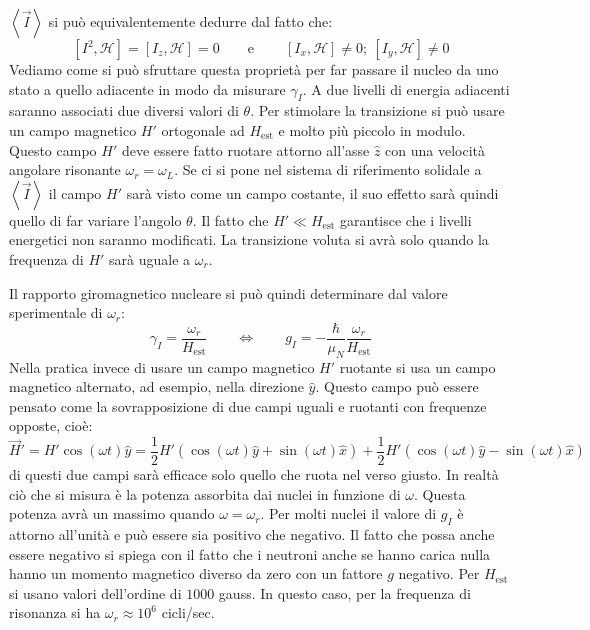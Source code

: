 $\left\langle \vec{I} \right\rangle$ si può equivalentemente dedurre dal fatto
che:
\begin{equation}
\left[ I^2, \mathcal{H} \right] = \left[ I_z, \mathcal{H} \right] = 0 \qquad 
\text{e}\ \qquad \left[ I_x, \mathcal{H} \right] \ne 0;\ \left[ I_y, 
\mathcal{H} \right] \ne 0
\end{equation}
Vediamo come si può sfruttare questa proprietà per far passare il nucleo da 
uno
stato a quello adiacente in modo da misurare $\gamma_I$. A due livelli di
energia adiacenti saranno associati due diversi valori di $\theta$. Per
stimolare la transizione si può usare un campo magnetico $H'$ ortogonale ad
$H_\text{est}$ e molto più piccolo in modulo. Questo campo $H'$ deve essere
fatto ruotare attorno all'asse $\hat{z}$ con una velocità angolare risonante
$\omega_r = \omega_L$. Se ci si pone nel sistema di riferimento solidale a
$\left\langle \vec{I} \right\rangle$ il campo $H'$ sarà visto come un campo
costante, il suo effetto sarà quindi quello di far variare l'angolo $\theta$. 
Il
fatto che $H' \ll H_\text{est}$ garantisce che i livelli energetici non saranno
modificati. La transizione voluta si avrà solo quando la frequenza di $H'$ 
sarà
uguale a $\omega_r$.

Il rapporto giromagnetico nucleare  si può quindi determinare dal valore
sperimentale di $\omega_r$:
\begin{equation}
\gamma_I = \frac{\omega_r}{H_\text{est}} \qquad \Leftrightarrow \qquad g_I = - 
\frac{\hbar}{\mu_N} \frac{\omega_r}{H_\text{est}}
\end{equation}
Nella pratica invece di usare un campo magnetico $H'$ ruotante si usa un campo
magnetico alternato, ad esempio, nella direzione $\hat{y}$. Questo campo può
essere pensato come la sovrapposizione di due campi uguali e ruotanti con
frequenze opposte, cioè:
\begin{equation}
\vec{H}' = H' \cos (\omega t) \hat{y} = \frac{1}{2} H' (\cos (\omega t) \hat{y} 
+ \sin (\omega t) \hat{x} ) + \frac{1}{2} H' (\cos (\omega t) \hat{y} - \sin 
(\omega t) \hat{x} )
\end{equation}
di questi due campi sarà efficace solo quello che ruota nel verso giusto. In
realtà ciò che si misura è la potenza assorbita dai nuclei in funzione di
$\omega$. Questa potenza avrà un massimo quando $\omega = \omega_r$. Per molti
nuclei il valore di $g_I$ è attorno all'unità e può essere sia positivo che
negativo. Il fatto che possa anche essere negativo si spiega con il fatto che i
neutroni anche se hanno carica nulla hanno un momento magnetico diverso da zero
con un fattore $g$ negativo. Per $H_\text{est}$ si usano valori dell'ordine di
$1000$ gauss. In questo caso, per la frequenza di risonanza si ha $\omega_r
\approx 10^6$ cicli/sec.

